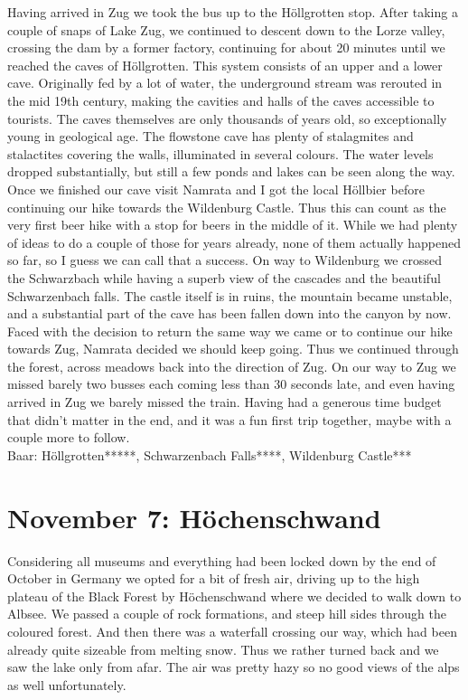 Having arrived in Zug we took the bus up to the H\"ollgrotten stop. After taking a couple of snaps of Lake Zug, we continued to descent down to the Lorze valley, crossing the dam by a former factory, continuing for about 20 minutes until we reached the caves of H\"ollgrotten. This system consists of an upper and a lower cave. Originally fed by a lot of water, the underground stream was rerouted in the mid 19th century, making the cavities and halls of the caves accessible to tourists. The caves themselves are only thousands of years old, so exceptionally young in geological age. The flowstone cave has plenty of stalagmites and stalactites covering the walls, illuminated in several colours. The water levels dropped substantially, but still a few ponds and lakes can be seen along the way.\\
Once we finished our cave visit Namrata and I got the local H\"ollbier before continuing our hike towards the Wildenburg Castle. Thus this can count as the very first beer hike with a stop for beers in the middle of it. While we had plenty of ideas to do a couple of those for years already, none of them actually happened so far, so I guess we can call that a success. On way to Wildenburg we crossed the Schwarzbach while having a superb view of the cascades and the beautiful Schwarzenbach falls. The castle itself is in ruins, the mountain became unstable, and a substantial part of the cave has been fallen down into the canyon by now. Faced with the decision to return the same way we came or to continue our hike towards Zug, Namrata decided we should keep going. Thus we continued through the forest, across meadows back into the direction of Zug. On our way to Zug we missed barely two busses each coming less than 30 seconds late, and even having arrived in Zug we barely missed the train. Having had a generous time budget that didn't matter in the end, and it was a fun first trip together, maybe with a couple more to follow.\\

Baar: H\"ollgrotten*****, Schwarzenbach Falls****, Wildenburg Castle***
 
\section{November 7: H\"ochenschwand}
\label{2020Hoechenschwand}

Considering all museums and everything had been locked down by the end of October in Germany we opted for a bit of fresh air, driving up to the high plateau of the Black Forest by H\"ochenschwand where we decided to walk down to Albsee. We passed a couple of rock formations, and steep hill sides through the coloured forest. And then there was a waterfall crossing our way, which had been already quite sizeable from melting snow. Thus we rather turned back and we saw the lake only from afar. The air was pretty hazy so no good views of the alps as well unfortunately.\\

